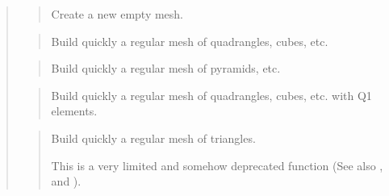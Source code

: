 \documentclass[a4paper,11pt,english]{sphinxmanual}
\begin{document}
\sphinxAtStartPar
{}
\begin{quote}

\sphinxAtStartPar
{}
\begin{quote}

\sphinxAtStartPar
Create a new empty mesh.
\end{quote}

\sphinxAtStartPar
{}
\begin{quote}

\sphinxAtStartPar
Build quickly a regular mesh of quadrangles, cubes, etc.
\end{quote}

\sphinxAtStartPar
{}
\begin{quote}

\sphinxAtStartPar
Build quickly a regular mesh of pyramids, etc.
\end{quote}

\sphinxAtStartPar
{}
\begin{quote}

\sphinxAtStartPar
Build quickly a regular mesh of quadrangles, cubes, etc. with
Q1 elements.
\end{quote}

\sphinxAtStartPar
{}
\begin{quote}

\sphinxAtStartPar
Build quickly a regular mesh of triangles.

\sphinxAtStartPar
This is a very limited and somehow deprecated function (See also
,  and
).
\end{quote}

\sphinxAtStartPar
{}
\begin{quote}


\end{quote}
\end{quote}
\end{document}
